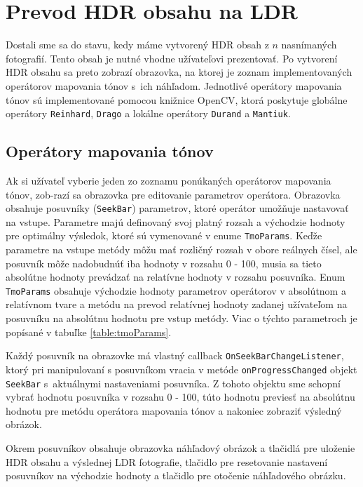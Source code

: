 \section{Prevod HDR obsahu na LDR}

Dostali sme sa do stavu, kedy máme vytvorený HDR obsah z $n$ nasnímaných fotografií. Tento obsah je nutné vhodne užívateľovi prezentovať.
Po vytvorení HDR obsahu sa preto zobrazí obrazovka, na ktorej je zoznam implementovaných operátorov mapovania tónov s~ich náhľadom.
Jednotlivé operátory mapovania tónov sú implementované pomocou knižnice OpenCV, ktorá poskytuje globálne operátory \texttt{Reinhard},
\texttt{Drago} a lokálne operátory \texttt{Durand} a \texttt{Mantiuk}.

\subsection{Operátory mapovania tónov}

Ak si užívateľ vyberie jeden zo zoznamu ponúkaných operátorov mapovania tónov, zob-razí sa obrazovka pre editovanie parametrov operátora.
Obrazovka obsahuje posuvníky (\texttt{SeekBar}) parametrov, ktoré operátor umožňuje nastavovať na vstupe. Parametre majú definovaný svoj
platný rozsah a východzie hodnoty pre optimálny výsledok, ktoré sú vymenované v enume \texttt{TmoParams}. Keďže parametre na vstupe metódy
môžu mať rozličný rozsah v obore reálnych čísel, ale posuvník môže nadobudnúť iba hodnoty v rozsahu 0 - 100, musia sa tieto absolútne hodnoty
prevádzať na relatívne hodnoty v rozsahu posuvníka. Enum \texttt{TmoParams} obsahuje východzie hodnoty parametrov operátorov v absolútnom
a relatívnom tvare a metódu na prevod relatívnej hodnoty zadanej užívateľom na posuvníku na absolútnu hodnotu pre vstup metódy. Viac o týchto
parametroch je popísané v tabuľke \ref{table:tmoParams}.

Každý posuvník na obrazovke má vlastný callback \texttt{OnSeekBarChangeListener}, ktorý pri manipulovaní s posuvníkom vracia v metóde
\texttt{onProgressChanged} objekt \texttt{SeekBar} s~aktuálnymi nastaveniami posuvníka. Z tohoto objektu sme schopní vybrať hodnotu posuvníka
v rozsahu 0 - 100, túto hodnotu previesť na absolútnu hodnotu pre metódu operátora mapovania tónov a nakoniec zobraziť výsledný obrázok.

Okrem posuvníkov obsahuje obrazovka náhľadový obrázok a tlačidlá pre uloženie HDR obsahu a výslednej LDR fotografie, tlačidlo pre resetovanie
nastavení posuvníkov na východzie hodnoty a tlačidlo pre otočenie náhľadového obrázku.


